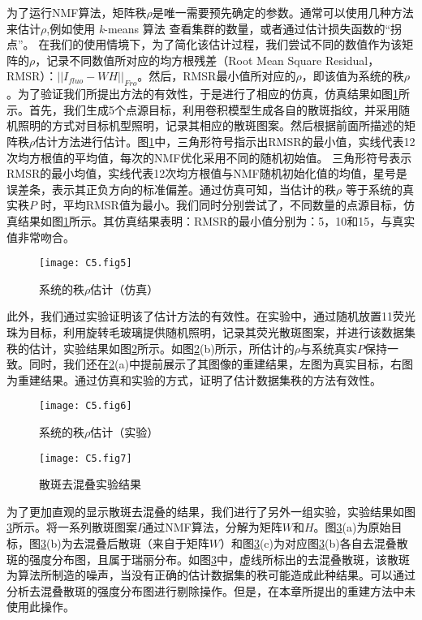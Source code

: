 为了运行NMF算法，矩阵秩$\rho$是唯一需要预先确定的参数。通常可以使用几种方法来估计$\rho$,例如使用 \textsl{k}-means 算法 \cite{Moretti2020a} 查看集群的数量，或者通过估计损失函数的“拐点”\cite{boniface_non_invasive_2020,hutchins_position_dependent_2008}。
在我们的使用情境下，为了简化该估计过程，我们尝试不同的数值作为该矩阵的$\rho$，记录不同数值所对应的均方根残差（Root Mean Square Residual，RMSR）：$\vert\vert I_{fluo}-WH \vert\vert_{Fro}$。然后，RMSR最小值所对应的$\rho$，即该值为系统的秩$\rho$。为了验证我们所提出方法的有效性，于是进行了相应的仿真，仿真结果如图\ref{fig:5.5}所示。首先，我们生成5个点源目标，利用卷积模型生成各自的散斑指纹，并采用随机照明的方式对目标机型照明，记录其相应的散斑图案。然后根据前面所描述的矩阵秩$\rho$估计方法进行估计。图\ref{fig:5.5}中，三角形符号指示出RMSR的最小值，实线代表12次均方根值的平均值，每次的NMF优化采用不同的随机初始值。
三角形符号表示RMSR的最小均值，实线代表12次均方根值与NMF随机初始化值的均值，星号是误差条，表示其正负方向的标准偏差。通过仿真可知，当估计的秩$\rho$ 等于系统的真实秩$P$ 时，平均RMSR值为最小。我们同时分别尝试了，不同数量的点源目标，仿真结果如图\ref{fig:5.5}所示。其仿真结果表明：RMSR的最小值分别为：5，10和15，与真实值非常吻合。

\begin{figure}[htp]
	\centering
	\texttt{[image: C5.fig5]}
	\caption{系统的秩$\rho$估计（仿真）}
	\label{fig:5.5}
\end{figure}

此外，我们通过实验证明该了估计方法的有效性。在实验中，通过随机放置11荧光珠为目标，利用旋转毛玻璃提供随机照明，记录其荧光散斑图案，并进行该数据集秩的估计，实验结果如图\ref{fig:5.6}所示。如图\ref{fig:5.6}(b)所示，所估计的$\rho$与系统真实$P$保持一致。同时，我们还在\ref{fig:5.6}(a)中提前展示了其图像的重建结果，左图为真实目标，右图为重建结果。通过仿真和实验的方式，证明了估计数据集秩的方法有效性。

\begin{figure}[htp]
	\centering
	\texttt{[image: C5.fig6]}
	\caption{系统的秩$\rho$估计（实验）}
	\label{fig:5.6}
\end{figure}

\begin{figure}[htp]
	\centering
	\texttt{[image: C5.fig7]}
	\caption{散斑去混叠实验结果}
	\label{fig:5.7}
\end{figure}

为了更加直观的显示散斑去混叠的结果，我们进行了另外一组实验，实验结果如图\ref{fig:5.7}所示。将一系列散斑图案$I$通过NMF算法，分解为矩阵$W$和$H$。图\ref{fig:5.7}(a)为原始目标，图\ref{fig:5.7}(b)为去混叠后散斑（来自于矩阵$W$）和图\ref{fig:5.7}(c)为对应图\ref{fig:5.7}(b)各自去混叠散斑的强度分布图，且属于瑞丽分布。如图\ref{fig:5.7}中，虚线所标出的去混叠散斑，该散斑为算法所制造的噪声，当没有正确的估计数据集的秩可能造成此种结果。可以通过分析去混叠散斑的强度分布图进行剔除操作。但是，在本章所提出的重建方法中未使用此操作。

